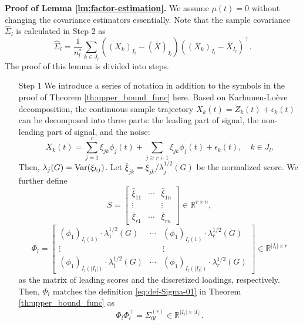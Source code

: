 \documentclass[11pt]{article}
\newcommand{\0}{{\mathbf{0}}}
\newcommand{\1}{{\mathbf{1}}}
\newcommand{\Var}{{\rm Var}}
\begin{document}
{\bf\noindent Proof of Lemma \ref{lm:factor-estimation}.} We assume $\mu(t)=0$ without changing the covariance estimators essentially. Note that the sample covariance $\hat{\Sigma}_l$ is calculated in Step 2 as 
$$\hat{\Sigma}_l = \frac{1}{n_l^\ast} \sum_{k\in J_l} \left((X_k)_{I_l} - (\bar{X})_{I_l}\right)\left((X_k)_{I_l} - \bar{X}_{I_l}\right)^\top.$$ 
The proof of this lemma is divided into steps.
\begin{enumerate}[leftmargin=*]
	\item[Step 1] We introduce a series of notation in addition to the symbols in the proof of Theorem \ref{th:upper_bound_func} here. Based on Karhunen-Lo\`eve decomposition, the continuous sample trajectory $X_k(t) = Z_k(t) + \epsilon_k(t)$ can be decomposed into three parts: the leading part of signal, the non-leading part of signal, and the noise:
	\begin{equation}\label{eq:X-k-observation}
	X_k(t) = \sum_{j=1}^r \xi_{jk}\phi_j(t)  + \sum_{j \geq r+1} \xi_{jk}\phi_j(t)  + \epsilon_{k}(t), \quad k\in J_l.
	\end{equation}
	Then, $\lambda_j(G) = \Var(\xi_{kj})$. Let $\bar{\xi}_{jk} = \xi_{jk}/\lambda^{1/2}_j(G)$ be the normalized score. We further define
	\begin{equation}
	S = \begin{bmatrix}
	\bar{\xi}_{11} & \cdots & \bar{\xi}_{1n}\\
	\vdots & & \vdots \\
	\bar{\xi}_{r1} & \cdots & \bar{\xi}_{rn}
	\end{bmatrix} \in \mathbb{R}^{r\times n},
	\end{equation}
	\begin{equation*}
	\Phi_l = \begin{bmatrix}
	(\phi_1)_{I_l(1)} \cdot \lambda_1^{1/2}(G) & \cdots  & (\phi_1)_{I_l(1)} \cdot \lambda_r^{1/2}(G)\\
	\vdots & & \vdots\\
	(\phi_1)_{I_l(|I_l|)} \cdot \lambda_1^{1/2}(G) & \cdots  & (\phi_1)_{I_l(|I_l|)} \cdot \lambda_r^{1/2}(G)
	\end{bmatrix}\in \mathbb{R}^{|I_l| \times r}
	\end{equation*}
	as the matrix of leading scores and the discretized loadings, respectively. Then, $\Phi_l$ matches the definition \eqref{eq:def-Sigma-01} in Theorem \ref{th:upper_bound_func} as
	\begin{equation}\label{eq:PhiPhi^top}
	\Phi_l\Phi_l^\top = \Sigma_{0l}^{(r)} \in \mathbb{R}^{|I_l|\times|I_l|}.

\end{equation}
\end{enumerate}
\end{document}
